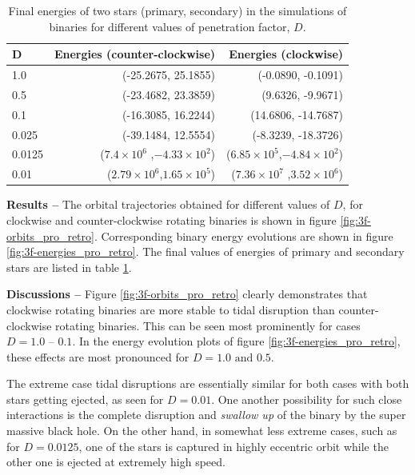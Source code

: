 \documentclass[a4paper]{article}
\begin{document}
\begin{enumerate} [label*=\textbf{(\alph*)}]
				\begin{table}
					\centering
					\begin{tabular} {l r r}
						\toprule
						\textbf{D} & \textbf{Energies (counter-clockwise)} & \textbf{Energies (clockwise)} \\
						\midrule
						1.0 & (-25.2675, 25.1855) & (-0.0890, -0.1091) \\
						0.5 & (-23.4682, 23.3859) & (9.6326, -9.9671) \\
						0.1 & (-16.3085, 16.2244) & (14.6806, -14.7687) \\
						0.025 & (-39.1484, 12.5554) & (-8.3239, -18.3726) \\
						0.0125 & (\(7.4 \times 10^6\) ,\(-4.33 \times 10^2\)) &  (\(6.85 \times 10^5\),\(-4.84 \times 10^2\)) \\
						0.01 & (\(2.79 \times 10^6\),\(1.65 \times 10^5\)) & (\(7.36 \times 10^7\)  ,\(3.52 \times 10^6\)) \\
						\bottomrule
					\end{tabular}
					\caption{Final energies of two stars (primary, secondary) in the simulations of binaries for different values of penetration factor, \(D\).}
					\label{table:3f-final_energies_d}
				\end{table}
				
				\subitem \textbf{Results --}
				The orbital trajectories obtained for different values of \(D\), for clockwise and counter-clockwise rotating binaries is shown in figure \ref{fig:3f-orbits_pro_retro}. Corresponding binary energy evolutions are shown in figure \ref{fig:3f-energies_pro_retro}. The final values of energies of primary and secondary stars are listed in table \ref{table:3f-final_energies_d}.
				
				\subitem \textbf{Discussions --}
				Figure \ref{fig:3f-orbits_pro_retro} clearly demonstrates that clockwise rotating binaries are more stable to tidal disruption than counter-clockwise rotating binaries. This can be seen most prominently for cases \(D=1.0\text{ -- }0.1\).
				In the energy evolution plots of figure \ref{fig:3f-energies_pro_retro}, these effects are most pronounced for \(D=1.0\text{ and }0.5\).
				
				The extreme case tidal disruptions are essentially similar for both cases with both stars getting ejected, as seen for \(D=0.01\). One another possibility for such close interactions is the complete disruption and \emph{swallow up} of the binary by the super massive black hole. On the other hand, in somewhat less extreme cases, such as for \(D=0.0125\), one of the stars is captured in highly eccentric orbit while the other one is ejected at extremely high speed.
				

\end{enumerate}
\end{document}
